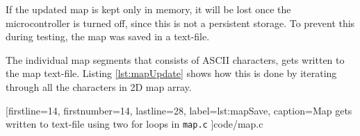 If the updated map is kept only in memory, it will be lost once the microcontroller is turned off, since this is not a persistent storage. To prevent this during testing, the map was saved in a text-file.

The individual map segments that consists of ASCII characters, gets written to the map text-file.
Listing \ref{lst:mapUpdate} shows how this is done by iterating through all the characters in 2D map array.


[firstline=14,			%
firstnumber=14,			%
lastline=28,			%
label=lst:mapSave,	%
caption={Map gets written to text-file using two for loops in {\tt map.c}}
]{code/map.c}
